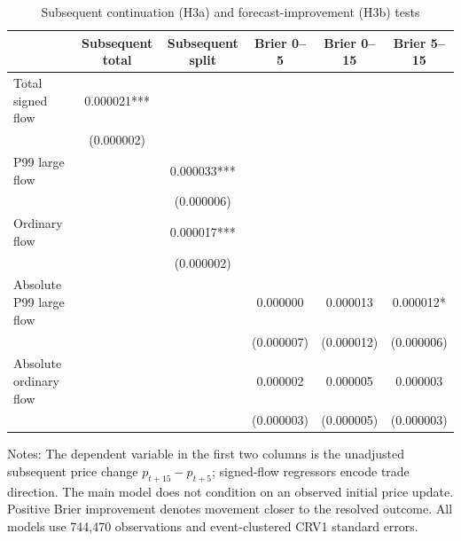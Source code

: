 \begin{table}[htbp]
\centering
\caption{Subsequent continuation (H3a) and forecast-improvement (H3b) tests}
\label{tab:h3}
\footnotesize
\setlength{\tabcolsep}{3pt}
\begin{tabular}{lccccc}
\hline
 & Subsequent total & Subsequent split & Brier 0--5 & Brier 0--15 & Brier 5--15 \\
\hline
Total signed flow & 0.000021*** &  &  &  &  \\
 & (0.000002) &  &  &  &  \\
P99 large flow &  & 0.000033*** &  &  &  \\
 &  & (0.000006) &  &  &  \\
Ordinary flow &  & 0.000017*** &  &  &  \\
 &  & (0.000002) &  &  &  \\
Absolute P99 large flow &  &  & 0.000000 & 0.000013 & 0.000012* \\
 &  &  & (0.000007) & (0.000012) & (0.000006) \\
Absolute ordinary flow &  &  & 0.000002 & 0.000005 & 0.000003 \\
 &  &  & (0.000003) & (0.000005) & (0.000003) \\
\hline
\end{tabular}
\par\vspace{3pt}
\begin{minipage}{\linewidth}
\footnotesize Notes: The dependent variable in the first two columns is the
unadjusted subsequent price change $p_{t+15}-p_{t+5}$; signed-flow regressors
encode trade direction. The main model does not condition on an observed
initial price update. Positive Brier improvement denotes movement closer to the
resolved outcome. All models use 744,470 observations and event-clustered CRV1
standard errors.
\end{minipage}
\end{table}
